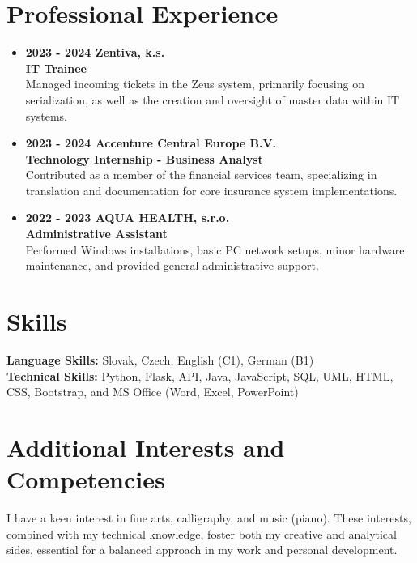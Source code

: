 \documentclass[a4paper,12pt]{article}
\begin{document}
\section*{Professional Experience}
\begin{itemize}[left=0pt, label={}]\setlength\itemsep{4pt}
    \item \textbf{2023 - 2024 Zentiva, k.s.} \\
    \textbf{IT Trainee} \\
    Managed incoming tickets in the Zeus system, primarily focusing on serialization, as well as the creation and oversight of master data within IT systems.

    \item \textbf{2023 - 2024 Accenture Central Europe B.V.} \\
    \textbf{Technology Internship - Business Analyst} \\
    Contributed as a member of the financial services team, specializing in translation and documentation for core insurance system implementations.

    \item \textbf{2022 - 2023 AQUA HEALTH, s.r.o.} \\
    \textbf{Administrative Assistant} \\
    Performed Windows installations, basic PC network setups, minor hardware maintenance, and provided general administrative support.
\end{itemize}

\section*{Skills}
\textbf{Language Skills:} Slovak, Czech, English (C1), German (B1) \\
\textbf{Technical Skills:} Python, Flask, API, Java, JavaScript, SQL, UML, HTML, CSS, Bootstrap, and MS Office (Word, Excel, PowerPoint)

\section*{Additional Interests and Competencies}
I have a keen interest in fine arts, calligraphy, and music (piano). These interests, combined with my technical knowledge, foster both my creative and analytical sides, essential for a balanced approach in my work and personal development.
\end{document}
